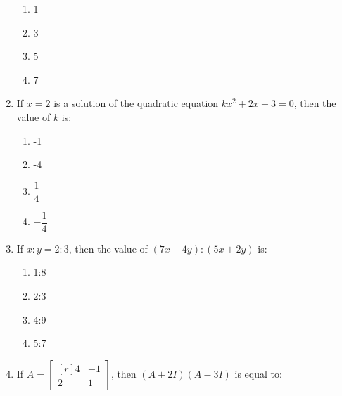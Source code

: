 \begin{enumerate}[label=(\roman*)]
        \begin{multicols}{2}
        \begin{enumerate}[label=(\alph*)]
            \item 1
            \item 3
            \item 5
            \item 7
        \end{enumerate}
        \end{multicols}

    \item If $x=2$ is a solution of the quadratic equation $kx^2 + 2x - 3=0$, then
        the value of $k$ is:

        \begin{multicols}{2}
        \begin{enumerate}[label=(\alph*)]
            \item -1
            \item -4
            \item $\dfrac14$
            \item $-\dfrac14$
        \end{enumerate}
        \end{multicols}

    \item If $x:y = 2:3$, then the value of $(7x-4y):(5x+2y)$ is: 

        \begin{multicols}{2}
        \begin{enumerate}[label=(\alph*)]
            \item 1:8 
            \item 2:3
            \item 4:9
            \item 5:7
        \end{enumerate}
        \end{multicols}

    \item If $A = \begin{bmatrix*}[r] 4 & -1 \\ 2 & 1 \end{bmatrix*}$, then 
        $(A + 2I)(A-3I)$ is equal to:


\end{enumerate}
